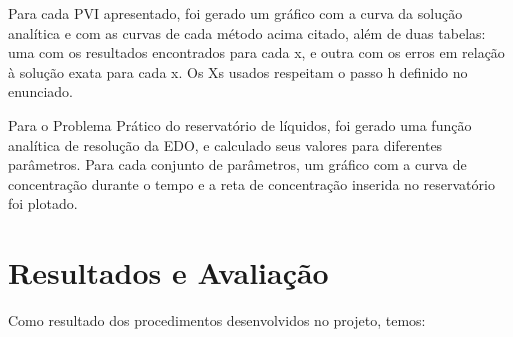 \documentclass[
	12pt,				%
    oneside,			%
	a4paper,			%
	english,			%
	french,				%
	spanish,			%
	brazil,				%
	]{abntex2}
\begin{document}
Para cada PVI apresentado, foi gerado um gráfico com a curva da solução analítica e com as curvas de cada método acima citado, além de duas tabelas: uma com os resultados encontrados para cada x, e outra com os erros em relação à solução exata para cada x. Os Xs usados respeitam o passo h definido no enunciado.

Para o Problema Prático do reservatório de líquidos, foi gerado uma função analítica de resolução da EDO, e calculado seus valores para diferentes parâmetros. Para cada conjunto de parâmetros, um gráfico com a curva de concentração durante o tempo e a reta de concentração inserida no reservatório foi plotado.


\chapter{Resultados e Avaliação}

Como resultado dos procedimentos desenvolvidos no projeto, temos:
\end{document}
